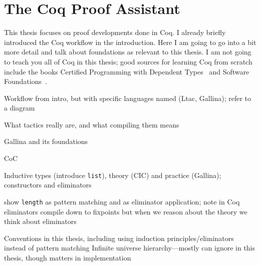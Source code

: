 \section{The Coq Proof Assistant}
\label{sec:mot-coq}

This thesis focuses on proof developments done in Coq.
I already briefly introduced the Coq workflow in the introduction.
Here I am going to go into a bit more detail and talk about foundations as relevant to this thesis.
I am not going to teach you all of Coq in this thesis;
good sources for learning Coq from scratch include the books Certified Programming with Dependent Types~\cite{chlipala:cpdt}
and Software Foundations~\cite{software-foundations}.

Workflow from intro, but with specific languages named (Ltac, Gallina); refer to a diagram

What tactics really are, and what compiling them means

Gallina and its foundations

CoC

Inductive types (introduce \lstinline{list}), theory (CIC) and practice (Gallina); constructors and eliminators

show \lstinline{length} as pattern matching and as eliminator application; note in Coq eliminators compile down to fixpoints
but when we reason about the theory we think about eliminators

Conventions in this thesis, including using induction principles/eliminators instead of pattern matching
Infinite universe hierarchy---mostly can ignore in this thesis, though matters in implementation
